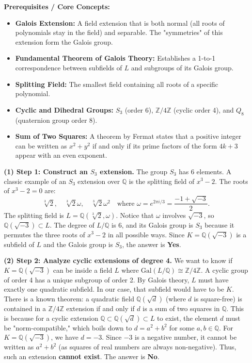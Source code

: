 \begin{solution}
\textbf{Prerequisites / Core Concepts:}
\begin{itemize}
    \item \textbf{Galois Extension:} A field extension that is both normal (all roots of polynomials stay in the field) and separable. The "symmetries" of this extension form the Galois group.
    \item \textbf{Fundamental Theorem of Galois Theory:} Establishes a 1-to-1 correspondence between subfields of $L$ and subgroups of its Galois group.
    \item \textbf{Splitting Field:} The smallest field containing all roots of a specific polynomial.
    \item \textbf{Cyclic and Dihedral Groups:} $S_3$ (order 6), $\mathbb{Z}/4\mathbb{Z}$ (cyclic order 4), and $Q_8$ (quaternion group order 8).
    \item \textbf{Sum of Two Squares:} A theorem by Fermat states that a positive integer can be written as $x^2 + y^2$ if and only if its prime factors of the form $4k+3$ appear with an even exponent.
\end{itemize}

\textbf{(1) Step 1: Construct an $S_3$ extension.}
The group $S_3$ has 6 elements. A classic example of an $S_3$ extension over $\mathbb{Q}$ is the splitting field of $x^3 - 2$. 
The roots of $x^3 - 2 = 0$ are:
\[ \sqrt[3]{2}, \quad \sqrt[3]{2}\omega, \quad \sqrt[3]{2}\omega^2 \quad \text{where } \omega = e^{2\pi i/3} = \frac{-1 + \sqrt{-3}}{2}. \]
The splitting field is $L = \mathbb{Q}(\sqrt[3]{2}, \omega)$. 
Notice that $\omega$ involves $\sqrt{-3}$, so $\mathbb{Q}(\sqrt{-3}) \subset L$. 
The degree of $L/\mathbb{Q}$ is 6, and its Galois group is $S_3$ because it permutes the three roots of $x^3-2$ in all possible ways.
Since $K = \mathbb{Q}(\sqrt{-3})$ is a subfield of $L$ and the Galois group is $S_3$, the answer is \textbf{Yes}.

\textbf{(2) Step 2: Analyze cyclic extensions of degree 4.}
We want to know if $K = \mathbb{Q}(\sqrt{-3})$ can be inside a field $L$ where $\text{Gal}(L/\mathbb{Q}) \cong \mathbb{Z}/4\mathbb{Z}$.
A cyclic group of order 4 has a unique subgroup of order 2. By Galois theory, $L$ must have exactly one quadratic subfield. In our case, that subfield would have to be $K$.
There is a known theorem: a quadratic field $\mathbb{Q}(\sqrt{d})$ (where $d$ is square-free) is contained in a $\mathbb{Z}/4\mathbb{Z}$ extension if and only if $d$ is a sum of two squares in $\mathbb{Q}$. 
This is because for a cyclic extension $\mathbb{Q} \subset \mathbb{Q}(\sqrt{d}) \subset L$ to exist, the element $d$ must be "norm-compatible," which boils down to $d = a^2 + b^2$ for some $a, b \in \mathbb{Q}$.
For $K = \mathbb{Q}(\sqrt{-3})$, we have $d = -3$. 
Since $-3$ is a negative number, it cannot be written as $a^2 + b^2$ (as squares of real numbers are always non-negative).
Thus, such an extension \textbf{cannot exist}. The answer is \textbf{No}.


\end{solution}
